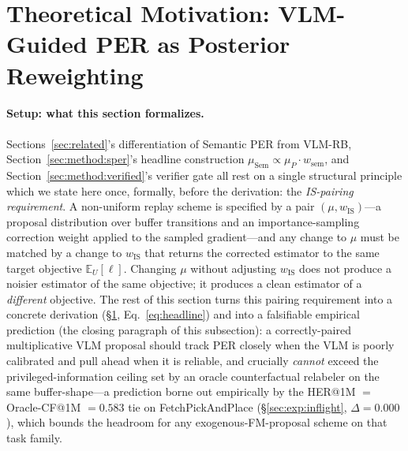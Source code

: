 \documentclass{article}
\begin{document}
\section{Theoretical Motivation: VLM-Guided PER as Posterior Reweighting}
\label{sec:theory}

\paragraph{Setup: what this section formalizes.}
Sections~\ref{sec:related}'s differentiation of Semantic PER from VLM-RB,
Section~\ref{sec:method:sper}'s headline construction
$\mu_{\text{Sem}}\!\propto\!\mu_P\!\cdot\!w_{\text{sem}}$, and
Section~\ref{sec:method:verified}'s verifier gate all rest on a single
structural principle which we state here once, formally, before the
derivation: the \emph{IS-pairing requirement}. A non-uniform replay scheme is
specified by a pair $(\mu,w_{\text{IS}})$---a proposal distribution over
buffer transitions and an importance-sampling correction weight applied to
the sampled gradient---and any change to $\mu$ must be matched by a change
to $w_{\text{IS}}$ that returns the corrected estimator to the same target
objective $\mathbb{E}_U[\ell]$. Changing $\mu$ without adjusting
$w_{\text{IS}}$ does not produce a noisier estimator of the same objective;
it produces a clean estimator of a \emph{different} objective. The rest of
this section turns this pairing requirement into a concrete derivation
(\S\ref{sec:theory}, Eq.~\ref{eq:headline}) and into a falsifiable
empirical prediction (the closing paragraph of this subsection): a
correctly-paired multiplicative VLM proposal should track PER closely when
the VLM is poorly calibrated and pull ahead when it is reliable, and
crucially \emph{cannot} exceed the privileged-information ceiling set by an
oracle counterfactual relabeler on the same buffer-shape---a prediction
borne out empirically by the HER@1M $=$ Oracle-CF@1M $= 0.583$ tie on
FetchPickAndPlace (\S\ref{sec:exp:inflight}, $\Delta = 0.000$), which bounds
the headroom for any exogenous-FM-proposal scheme on that task family.
\end{document}

